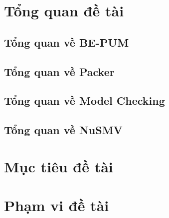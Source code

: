 \section{Tổng quan đề tài}

\subsection{Tổng quan về BE-PUM}

\subsection{Tổng quan về Packer}

\subsection{Tổng quan về Model Checking}

\subsection{Tổng quan về NuSMV}

\section{Mục tiêu đề tài}

\section{Phạm vi đề tài}

